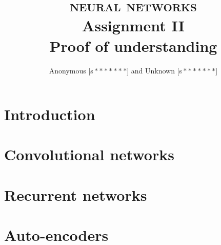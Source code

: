 \documentclass[11pt]{article}
\author{Anonymous [s\,$*******$] and Unknown [s\,$*******$]}
\title{\textsc{\Huge neural networks}\\Assignment II\\[6mm]\large\bf Proof of understanding}
\begin{document}
\maketitle

\section{Introduction}
\section{Convolutional networks}
\section{Recurrent networks}
\section{Auto-encoders}

\vspace*{\fill}
\begin{thebibliography}{x}

\end{thebibliography}
\end{document}
